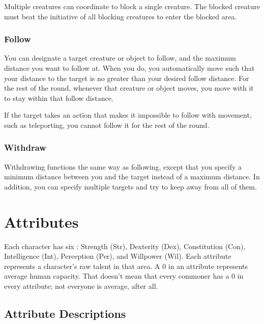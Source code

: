             Multiple creatures can coordinate to block a single creature.
            The blocked creature must beat the initiative of all blocking creatures to enter the blocked area.

        \subsubsection{Follow}\label{Follow}
            You can designate a target creature or object to follow, and the maximum distance you want to follow at. When you do, you automatically move such that your distance to the target is no greater than your desired follow distance. For the rest of the round, whenever that creature or object moves, you move with it to stay within that follow distance.

            If the target takes an action that makes it impossible to follow with movement, such as teleporting, you cannot follow it for the rest of the round.

        \subsubsection{Withdraw}\label{Withdraw}
            Withdrawing functions the same way as following, except that you specify a minimum distance between you and the target instead of a maximum distance.
            In addition, you can specify multiple targets and try to keep away from all of them.

    \section{Attributes}\label{Attributes}

    Each character has six : Strength (Str), Dexterity (Dex), Constitution (Con), Intelligence (Int), Perception (Per), and Willpower (Wil).
    Each attribute represents a character's raw talent in that area.
    A 0 in an attribute represents average human capacity.
    That doesn't mean that every commoner has a 0 in every attribute; not everyone is average, after all.

    \subsection{Attribute Descriptions}

